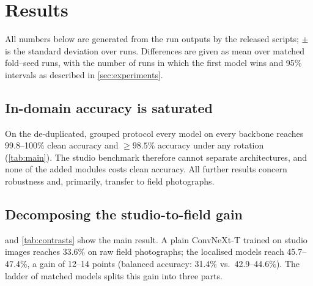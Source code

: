 \section{Results}
\label{sec:results}

All numbers below are generated from the run outputs by the released scripts; $\pm$ is the standard
deviation over runs. Differences are given as mean over matched fold--seed runs, with the number of
runs in which the first model wins and 95\% intervals as described in \cref{sec:experiments}.

\begin{table}[t]
\centering
\caption{Main results (\%). Clean = in-domain grouped 5-fold accuracy; Rot.\ min = worst accuracy over
12 rotations; MedLeaf-C = mean over 10 corruptions $\times$ 3 severities; Shape bias from the
cue-conflict set; Field = 20-way accuracy on DIMPSAR field photographs (auto-masked or raw).
ConvNeXt-T: 5 folds $\times$ 5 seeds (MedLeaf-C: seed 0, the seed run for every model; Rot.\ min
and shape bias: seed 0); EfficientNet-B0: 5 folds
$\times$ 3 seeds; ViT-S, DINOv2 and BioCLIP~2: 5 folds, one seed. Patch pooling was run on ConvNeXt-T
only, mask pooling on ConvNeXt-T and DINOv2.}
\label{tab:main}
\small
\resizebox{\textwidth}{!}{}
\end{table}

\subsection{In-domain accuracy is saturated}
On the de-duplicated, grouped protocol every model on every backbone reaches 99.8--100\% clean
accuracy and $\ge98.5\%$ accuracy under any rotation (\cref{tab:main}). The studio benchmark therefore
cannot separate architectures, and none of the added modules costs clean accuracy. All further
results concern robustness and, primarily, transfer to field photographs.

\subsection{Decomposing the studio-to-field gain}
\label{sec:decomp}
 and \cref{tab:contrasts} show the main result. A plain ConvNeXt-T trained on
studio images reaches 33.6\% on raw field photographs; the localised models reach 45.7--47.4\%, a gain
of 12--14 points (balanced accuracy: 31.4\% vs.\ 42.9--44.6\%). The ladder of matched models splits
this gain into three parts.

